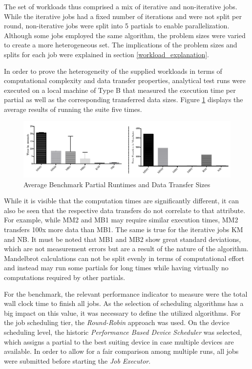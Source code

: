 The set of workloads thus comprised a mix of iterative and non-iterative jobs. While the iterative jobs had a fixed number of iterations and were not split per round, non-iterative jobs were split into 5 partials to enable parallelization. Although some jobs employed the same algorithm, the problem sizes were varied to create a more heterogeneous set. The implications of the problem sizes and splits for each job were explained in section \ref{workload_explanation}.

In order to prove the heterogeneity of the supplied workloads in terms of computational complexity and data transfer properties, analytical test runs were executed on a local machine of Type B that measured the execution time per partial as well as the corresponding transferred data sizes. Figure \ref{img:benchmark_kernel_attributes} displays the average results of running the suite five times.

\begin{figure}[H]

	\includegraphics[width=1.0\textwidth]{images/benchmark_kernel_data_transfers.pdf}
	\centering
	\caption{Average Benchmark Partial Runtimes and Data Transfer Sizes}
	\label{img:benchmark_kernel_attributes}
\end{figure}

While it is visible that the computation times are significantly different, it can also be seen that the respective data transfers do not correlate to that attribute. For example, while MM2 and MB1 may require similar execution times, MM2 transfers 100x more data than MB1. The same is true for the iterative jobs KM and NB. It must be noted that MB1 and MB2 show great standard deviations, which are not measurement errors but are a result of the nature of the algorithm. Mandelbrot calculations can not be split evenly in terms of computational effort and instead may run some partials for long times while having virtually no computations required by other partials.

For the benchmark, the relevant performance indicator to measure were the total wall clock time to finish all jobs. As the selection of scheduling algorithms has a big impact on this value, it was necessary to define the utilized algorithms. For the job scheduling tier, the \textit{Round-Robin} approach was used. On the device scheduling level, the historic \textit{Performance Based Device Scheduler} was selected, which assigns a partial to the best suiting device in case multiple devices are available. In order to allow for a fair comparison among multiple runs, all jobs were submitted before starting the \textit{Job Executor}.

